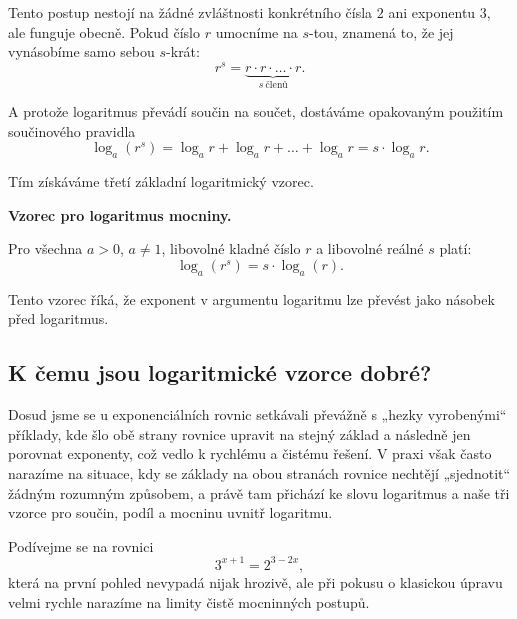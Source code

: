 \documentclass[12pt,a4paper]{article}
\begin{document}
Tento postup nestojí na žádné zvláštnosti konkrétního čísla $2$ ani exponentu $3$,
ale funguje obecně. Pokud číslo $r$ umocníme na $s$-tou, znamená to, že jej
vynásobíme samo sebou $s$-krát:
\[
r^s = \underbrace{r \cdot r \cdot \dots \cdot r}_{s\ \text{členů}}.
\]

A protože logaritmus převádí součin na součet, dostáváme opakovaným použitím
součinového pravidla
\[
\log_a(r^s)
=
\log_a r + \log_a r + \dots + \log_a r
=
s \cdot \log_a r.
\]

Tím získáváme třetí základní logaritmický vzorec.


\begin{definitionbox}
\textbf{Vzorec pro logaritmus mocniny.}

Pro všechna $a>0$, $a\neq 1$, libovolné kladné číslo $r$
a libovolné reálné $s$ platí:
\[
\log_a(r^s) = s \cdot \log_a(r).
\]

Tento vzorec říká, že exponent v argumentu logaritmu lze převést jako
násobek před logaritmus.
\end{definitionbox}



\subsection*{K čemu jsou logaritmické vzorce dobré?}

Dosud jsme se u exponenciálních rovnic setkávali převážně s „hezky vyrobenými“
příklady, kde šlo obě strany rovnice upravit na stejný základ a následně jen porovnat
exponenty, což vedlo k rychlému a čistému řešení. V praxi však často narazíme na
situace, kdy se základy na obou stranách rovnice nechtějí „sjednotit“ žádným rozumným
způsobem, a právě tam přichází ke slovu logaritmus a naše tři vzorce pro součin, podíl
a mocninu uvnitř logaritmu.

Podívejme se na rovnici
\[
3^{x+1} = 2^{3-2x},
\]
která na první pohled nevypadá nijak hrozivě, ale při pokusu o klasickou úpravu velmi
rychle narazíme na limity čistě mocninných postupů.
\end{document}
